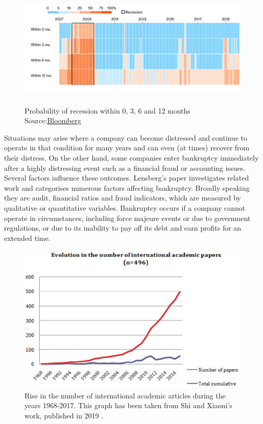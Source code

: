 \begin{figure}[htp]
  \centering
    
      {\includegraphics[height=5cm,width=\columnwidth]{Images/recession.png}}
  \caption{Probability of recession within 0, 3, 6 and 12 months \\ 
  Source:\href{https://www.bloomberg.com/graphics/us-economic-recession-tracker/}{Bloomberg}}
  \label{fig:US_recession_prob}
\end{figure}

Situations may arise where a company can become distressed and continue to operate in that condition for many years and can even (at times) recover from their distress. On the other hand, some companies enter bankruptcy immediately after a highly distressing event such as a financial fraud or accounting issues. Several factors influence these outcomes. Lensberg's paper \cite{lensberg2006bankruptcy} investigates related work and categorises numerous factors affecting bankruptcy. Broadly speaking they are audit, financial ratios and fraud indicators, which are measured by qualitative or quantitative variables.
Bankruptcy occurs if a company cannot operate in circumstances, including force majeure events or due to government regulations, or due to its inability to pay off its debt and earn profits for an extended time. 

\begin{figure}[htp]
\centering
  
  \centering
    \includegraphics[width=\columnwidth]{Images/evo.png}
  \caption{Rise in the number of international academic articles during the years 1968-2017. This graph has been taken from Shi and Xiaoni's work, published in 2019 \cite{shi2019overview}.}
 \label{fig:numberofcases}
\end{figure}

